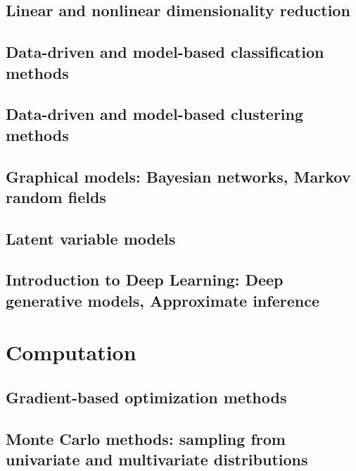 \documentclass{article}
\begin{document}
\subsection{Linear and nonlinear dimensionality reduction}
\subsection{Data-driven and model-based classification methods}
\subsection{Data-driven and model-based clustering methods}
\subsection{Graphical models: Bayesian networks, Markov random fields}
\subsection{Latent variable models}
\subsection{Introduction to Deep Learning: Deep generative models, Approximate inference}

\section{Computation}
\subsection{Gradient-based optimization methods}
\subsection{Monte Carlo methods: sampling from univariate and multivariate distributions}

\end{document}
